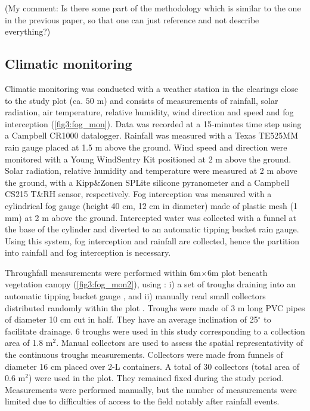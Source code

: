 \documentclass[a4paper,12pt]{article}
\begin{document}
\begin{linenumbers}
(My comment: Is there some part of the methodology which is similar to the one in the previous paper, so that one can just reference and not describe everything?)

\subsection{Climatic monitoring} \label{sec:fog_int_moni}
Climatic monitoring was conducted with a weather station in the clearings close to the study plot (ca. $50$ $\mathrm{m}$) and consists of measurements of rainfall, solar radiation, air temperature, relative humidity, wind direction and speed and fog interception (\autoref{fig3:fog_mon}). Data was recorded at a 15-minutes time step using a Campbell CR1000 datalogger. Rainfall was measured with a Texas TE525MM rain gauge placed at 1.5 m above the ground. Wind speed and direction were monitored with a Young WindSentry Kit positioned at 2 m above the ground. Solar radiation, relative humidity and temperature were measured at 2 m above the ground, with a Kipp\&Zonen SPLite silicone pyranometer and a Campbell CS215 T\&RH sensor, respectively. Fog interception was measured with a cylindrical fog gauge (height 40 cm, 12 cm in diameter) made of plastic mesh (1 mm) at 2 m above the ground. Intercepted water was collected with a funnel at the base of the cylinder and diverted to an automatic tipping bucket rain gauge. Using this system, fog interception and rainfall are collected, hence the partition into rainfall and fog interception is necessary.


Throughfall measurements were performed within 6m$\times$6m plot beneath vegetation canopy (\autoref{fig3:fog_mon2}), using \citep{Dominguez2011, Pryetetal2012a}: i) a set of troughs draining into an automatic tipping bucket gauge \citep{Ziegleretal2009, Holwerdaetal2010, Zimmermannetal2014}, and ii) manually read small collectors distributed randomly within the plot \citep{Keimetal2005, Staelensetal2006, Zimmermannetal2009}. Troughs were made of 3 m long PVC pipes of diameter 10 cm cut in half. They have an average inclination of 25$^\circ$ to facilitate drainage. 6 troughs were used in this study corresponding to a collection area of 1.8 m$^2$. Manual collectors are used to assess the spatial representativity of the continuous troughs measurements. Collectors were made from funnels of diameter 16 cm placed over 2-L containers. A total of 30 collectors (total area of 0.6 m$^2$) were used in the plot. They remained fixed during the study period. Measurements were performed manually, but the number of measurements were limited due to difficulties of access to the field notably after rainfall events. 



\end{linenumbers}
\end{document}
